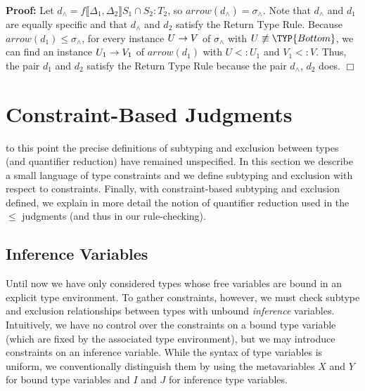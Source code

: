 \documentclass[10pt]{sigplanconf}
\newcommand{\subtypeof}{\ensuremath{<:}}
\newcommand{\arrowtype}[2]{\mbox{\ensuremath{{#1} \rightarrow {#2}}}}
\newcommand{\arrow}{\ensuremath{\mathit{arrow}}}
\newcommand{\ob}[1]{\ensuremath{\llbracket {#1} \rrbracket}}
\newcommand{\Bottom}{\TYP{Bottom}}
\newenvironment{proof}{\noindent \textbf{Proof:} }{\hfill $\Box$}
\begin{document}
\begin{proof}
Let $d_{\wedge} = f\ob{\Delta_1, \Delta_2} S_1 \cap S_2 : T_2$, 
so $\arrow(d_{\wedge}) = \sigma_{\wedge}$. 
Note that $d_{\wedge}$ and $d_1$ are equally specific and 
that $d_{\wedge}$ and $d_2$ satisfy the Return Type Rule. 
Because $\arrow(d_1) \le \sigma_{\wedge}$,
for every instance $\arrowtype{U}{V}$ of $\sigma_{\wedge}$ with $U \not \equiv \Bottom$,
we can find an instance $\arrowtype{U_1}{V_1}$ of $\arrow(d_1)$ 
with $U \subtypeof U_1$ and $V_1 \subtypeof V$. 
Thus, the pair $d_1$ and $d_2$ satisfy the Return Type Rule because the pair $d_{\wedge}$, $d_2$ does.
\end{proof}



\section{Constraint-Based Judgments}\label{sec:constraints}
\Up to this point the precise definitions of subtyping and exclusion between
types (and quantifier reduction) have remained unspecified. In this section
we describe a small language of type constraints 
and we define subtyping and exclusion with respect to constraints. 
Finally, with constraint-based subtyping and exclusion defined, we explain
in more detail the notion of quantifier reduction used in the $\le$ judgments (and thus in our rule-checking).

\subsection{Inference Variables}

Until now we have only considered types whose free variables are bound in an explicit type environment. To gather constraints, however, we must check
subtype and exclusion relationships between types with unbound \emph{inference} variables.
Intuitively, we have no control over the constraints on a bound type variable (which are fixed by the associated type environment), but we may introduce constraints on an inference variable.
While the syntax of type variables is uniform, we conventionally distinguish them by using the metavariables $X$ and $Y$ for bound type variables and $I$ and $J$ for inference type variables.
\end{document}
